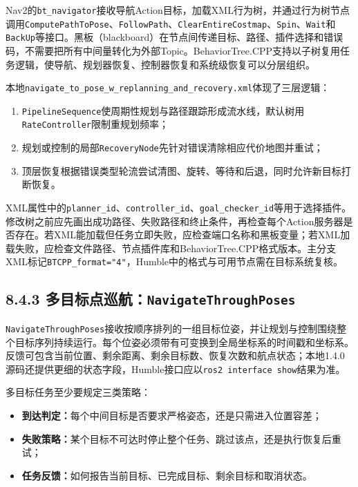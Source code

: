 \documentclass[UTF8,zihao=-4]{ctexart}
\begin{document}
Nav2的\texttt{bt\_navigator}接收导航Action目标，加载XML行为树，并通过行为树节点调用\texttt{ComputePathToPose}、\texttt{FollowPath}、\texttt{ClearEntireCostmap}、\texttt{Spin}、\texttt{Wait}和\texttt{BackUp}等接口。黑板（blackboard）在节点间传递目标、路径、插件选择和错误码，不需要把所有中间量转化为外部Topic。BehaviorTree.CPP支持以子树复用任务逻辑，使导航、规划器恢复、控制器恢复和系统级恢复可以分层组织\cite{macenski2020nav2}。

本地\texttt{navigate\_to\_pose\_w\_replanning\_and\_recovery.xml}体现了三层逻辑\cite{navigation2source}：
\begin{enumerate}
  \item \texttt{PipelineSequence}使周期性规划与路径跟踪形成流水线，默认树用\texttt{RateController}限制重规划频率；
  \item 规划或控制的局部\texttt{RecoveryNode}先针对错误清除相应代价地图并重试；
  \item 顶层恢复根据错误类型轮流尝试清图、旋转、等待和后退，同时允许新目标打断恢复。
\end{enumerate}

XML属性中的\texttt{planner\_id}、\texttt{controller\_id}、\texttt{goal\_checker\_id}等用于选择插件。修改树之前应先画出成功路径、失败路径和终止条件，再检查每个Action服务器是否存在。若XML能加载但任务立即失败，应检查端口名称和黑板变量；若XML加载失败，应检查文件路径、节点插件库和BehaviorTree.CPP格式版本。主分支XML标记\texttt{BTCPP\_format="4"}，Humble中的格式与可用节点需在目标系统复核。

\subsection*{8.4.3 多目标点巡航：\texttt{NavigateThroughPoses}}

\texttt{NavigateThroughPoses}接收按顺序排列的一组目标位姿，并让规划与控制围绕整个目标序列持续运行。每个位姿必须带有可变换到全局坐标系的时间戳和坐标系。反馈可包含当前位置、剩余距离、剩余目标数、恢复次数和航点状态；本地1.4.0源码还提供更细的状态字段，Humble接口应以\texttt{ros2 interface show}结果为准\cite{navigation2source}。

多目标任务至少要规定三类策略：
\begin{itemize}
  \item \textbf{到达判定：}每个中间目标是否要求严格姿态，还是只需进入位置容差；
  \item \textbf{失败策略：}某个目标不可达时停止整个任务、跳过该点，还是执行恢复后重试；
  \item \textbf{任务反馈：}如何报告当前目标、已完成目标、剩余目标和取消状态。
\end{itemize}
\end{document}
